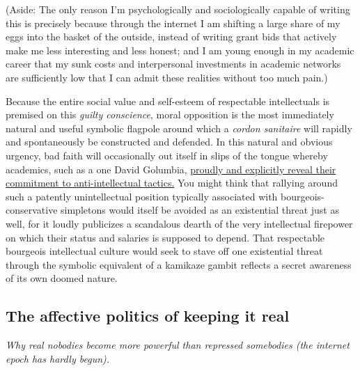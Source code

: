 \documentclass[a4paper,12pt,margin=.5in]{article}
\begin{document}
(Aside: The only reason I'm psychologically and sociologically capable
of writing this is precisely because through the internet I am shifting
a large share of my eggs into the basket of the outside, instead of
writing grant bids that actively make me less interesting and less
honest; and I am young enough in my academic career that my sunk costs
and interpersonal investments in academic networks are sufficiently low
that I can admit these realities without too much pain.)

Because the entire social value and self-esteem of respectable
intellectuals is premised on this \emph{guilty conscience}, moral
opposition is the most immediately natural and useful symbolic flagpole
around which a \emph{cordon sanitaire} will rapidly and spontaneously be
constructed and defended. In this natural and obvious urgency, bad faith
will occasionally out itself in slips of the tongue whereby academics,
such as a one David Golumbia,
\href{https://twitter.com/dgolumbia/status/848538857331191809}{proudly
and explicitly reveal their commitment to anti-intellectual tactics.}
You might think that rallying around such a patently unintellectual
position typically associated with bourgeois-conservative simpletons
would itself be avoided as an existential threat just as well, for it
loudly publicizes a scandalous dearth of the very intellectual firepower
on which their status and salaries is supposed to depend. That
respectable bourgeois intellectual culture would seek to stave off one
existential threat through the symbolic equivalent of a kamikaze gambit
reflects a secret awareness of its own doomed nature.

\subsection{The affective politics of keeping it
real}\label{the-affective-politics-of-keeping-it-real}

\emph{Why real nobodies become more powerful than repressed somebodies
(the internet epoch has hardly begun).}
\end{document}
